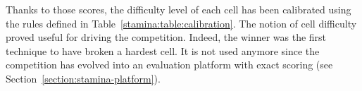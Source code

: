Thanks to those scores, the difficulty level of each cell has been calibrated using the rules defined in Table~\ref{stamina:table:calibration}. The notion of cell difficulty proved useful for driving the competition. Indeed, the winner was the first technique to have broken a hardest cell. It is not used anymore since the competition has evolved into an evaluation platform with exact scoring (see Section~\ref{section:stamina-platform}).
